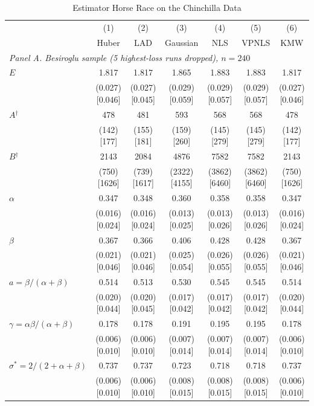 \begin{table}[!htbp]
\centering
\scriptsize
\caption{Estimator Horse Race on the Chinchilla Data}
\label{tab:m1_horse_race}
\begin{threeparttable}
\begin{tabular}{lcccccc}
\toprule
 & (1) & (2) & (3) & (4) & (5) & (6) \\
 & Huber & LAD & Gaussian & NLS & VPNLS & KMW \\
\midrule
\multicolumn{7}{l}{\textit{Panel A. Besiroglu sample (5 highest-loss runs dropped), $n=240$}} \\
$E$ & 1.817 & 1.817 & 1.865 & 1.883 & 1.883 & 1.817 \\
 & (0.027) [0.046] & (0.027) [0.045] & (0.029) [0.059] & (0.029) [0.057] & (0.029) [0.057] & (0.027) [0.046] \\
$A$$^\dagger$ & 478 & 481 & 593 & 568 & 568 & 478 \\
 & (142) [177] & (155) [181] & (159) [260] & (145) [279] & (145) [279] & (142) [177] \\
$B$$^\dagger$ & 2143 & 2084 & 4876 & 7582 & 7582 & 2143 \\
 & (750) [1626] & (739) [1617] & (2322) [4155] & (3862) [6460] & (3862) [6460] & (750) [1626] \\
$\alpha$ & 0.347 & 0.348 & 0.360 & 0.358 & 0.358 & 0.347 \\
 & (0.016) [0.024] & (0.016) [0.024] & (0.013) [0.025] & (0.013) [0.026] & (0.013) [0.026] & (0.016) [0.024] \\
$\beta$ & 0.367 & 0.366 & 0.406 & 0.428 & 0.428 & 0.367 \\
 & (0.021) [0.046] & (0.021) [0.046] & (0.025) [0.054] & (0.026) [0.055] & (0.026) [0.055] & (0.021) [0.046] \\
$a=\beta/(\alpha+\beta)$ & 0.514 & 0.513 & 0.530 & 0.545 & 0.545 & 0.514 \\
 & (0.020) [0.044] & (0.020) [0.045] & (0.017) [0.042] & (0.017) [0.042] & (0.017) [0.042] & (0.020) [0.044] \\
$\gamma=\alpha\beta/(\alpha+\beta)$ & 0.178 & 0.178 & 0.191 & 0.195 & 0.195 & 0.178 \\
 & (0.006) [0.010] & (0.006) [0.010] & (0.007) [0.014] & (0.007) [0.014] & (0.007) [0.014] & (0.006) [0.010] \\
$\sigma^*=2/(2+\alpha+\beta)$ & 0.737 & 0.737 & 0.723 & 0.718 & 0.718 & 0.737 \\
 & (0.006) [0.010] & (0.006) [0.010] & (0.008) [0.015] & (0.008) [0.015] & (0.008) [0.015] & (0.006) [0.010] \\

\end{tabular}
\end{threeparttable}
\end{table}
